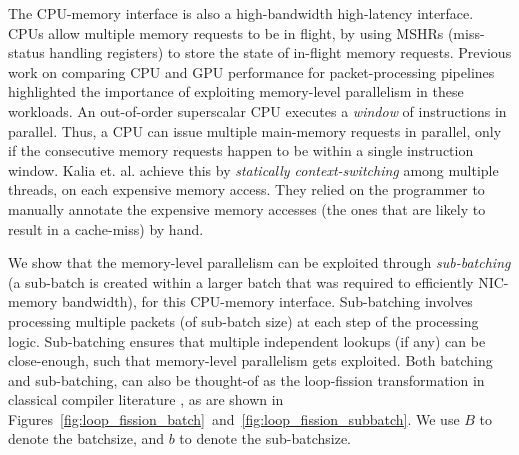 The CPU-memory interface is also a high-bandwidth high-latency interface. CPUs allow multiple
memory requests to be in flight, by using MSHRs (miss-status handling registers) to store the
state of in-flight memory requests. Previous work on comparing CPU and GPU performance for
packet-processing pipelines \cite{189006} highlighted the importance of exploiting
memory-level parallelism in these workloads.
An out-of-order superscalar CPU executes a {\em window} of instructions in parallel.
Thus, a CPU can issue multiple main-memory requests in parallel, only if the consecutive memory
requests happen to be within a single instruction window. Kalia et. al. \cite{189006}
achieve this by {\em statically context-switching} among multiple threads, on each
expensive memory access. They relied on the programmer to manually annotate the expensive
memory accesses (the ones that are likely to result in a cache-miss) by hand.

We show that the memory-level parallelism can be exploited through {\em sub-batching} (a sub-batch
is created within a larger batch that was required to efficiently NIC-memory bandwidth), for this
CPU-memory interface. Sub-batching involves processing multiple packets (of sub-batch size) at
each step of the processing logic.
Sub-batching ensures that multiple independent lookups (if any) can be close-enough, such that
memory-level parallelism gets exploited.
Both batching and sub-batching, can also be thought-of as
the loop-fission transformation in classical compiler literature \cite{loop_fission}, as are
shown in Figures~\ref{fig:loop_fission_batch}~and~\ref{fig:loop_fission_subbatch}. We use $B$
to denote the batchsize, and $b$ to denote the sub-batchsize.

